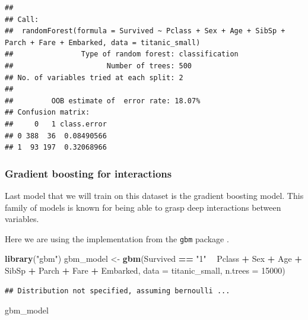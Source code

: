 \documentclass[]{krantz}
\newenvironment{Shaded}{\begin{snugshade}}{\end{snugshade}}
\newcommand{\DataTypeTok}[1]{\textcolor[rgb]{0.13,0.29,0.53}{#1}}
\newcommand{\DecValTok}[1]{\textcolor[rgb]{0.00,0.00,0.81}{#1}}
\newcommand{\KeywordTok}[1]{\textcolor[rgb]{0.13,0.29,0.53}{\textbf{#1}}}
\newcommand{\NormalTok}[1]{#1}
\newcommand{\OperatorTok}[1]{\textcolor[rgb]{0.81,0.36,0.00}{\textbf{#1}}}
\newcommand{\StringTok}[1]{\textcolor[rgb]{0.31,0.60,0.02}{#1}}
\theoremstyle{definition}
\theoremstyle{definition}
\theoremstyle{definition}
\theoremstyle{remark}
\begin{document}
\begin{verbatim}
## 
## Call:
##  randomForest(formula = Survived ~ Pclass + Sex + Age + SibSp +      Parch + Fare + Embarked, data = titanic_small) 
##                Type of random forest: classification
##                      Number of trees: 500
## No. of variables tried at each split: 2
## 
##         OOB estimate of  error rate: 18.07%
## Confusion matrix:
##     0   1 class.error
## 0 388  36  0.08490566
## 1  93 197  0.32068966
\end{verbatim}

\hypertarget{gradient-boosting-for-interactions}{%
\subsubsection{Gradient boosting for
interactions}\label{gradient-boosting-for-interactions}}

Last model that we will train on this dataset is the gradient boosting
model. This family of models is known for being able to grasp deep
interactions between variables.

Here we are using the implementation from the \texttt{gbm} package
\citep{gbm}.

\begin{Shaded}
\begin{Highlighting}[]
\KeywordTok{library}\NormalTok{(}\StringTok{"gbm"}\NormalTok{)}
\NormalTok{gbm_model <-}\StringTok{ }\KeywordTok{gbm}\NormalTok{(Survived }\OperatorTok{==}\StringTok{ "1"} \OperatorTok{~}\StringTok{ }\NormalTok{Pclass }\OperatorTok{+}\StringTok{ }\NormalTok{Sex }\OperatorTok{+}\StringTok{ }\NormalTok{Age }\OperatorTok{+}\StringTok{ }\NormalTok{SibSp }\OperatorTok{+}
\StringTok{                     }\NormalTok{Parch }\OperatorTok{+}\StringTok{ }\NormalTok{Fare }\OperatorTok{+}\StringTok{ }\NormalTok{Embarked, }\DataTypeTok{data =}\NormalTok{ titanic_small, }\DataTypeTok{n.trees =} \DecValTok{15000}\NormalTok{)}
\end{Highlighting}
\end{Shaded}

\begin{verbatim}
## Distribution not specified, assuming bernoulli ...
\end{verbatim}

\begin{Shaded}
\begin{Highlighting}[]
\NormalTok{gbm_model}
\end{Highlighting}
\end{Shaded}
\end{document}
